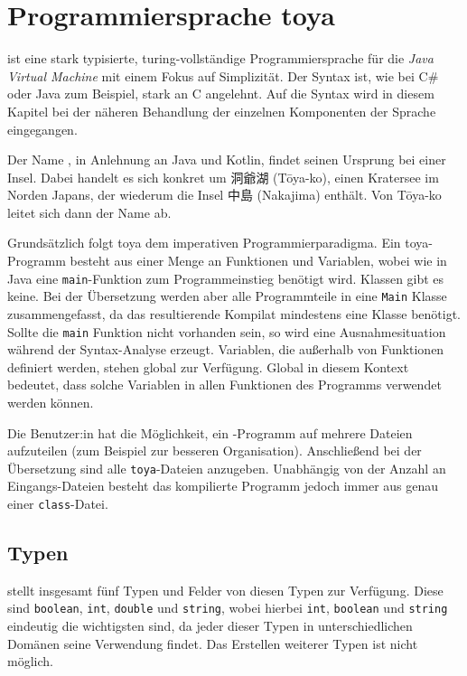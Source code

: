 \chapter{Programmiersprache toya}
\label{cha:toya}

\toya ist eine stark typisierte, turing-vollständige Programmiersprache für die \textit{Java Virtual Machine} mit einem Fokus auf Simplizität. Der Syntax ist, wie bei C\# oder Java zum Beispiel, stark an C angelehnt. Auf die Syntax wird in diesem Kapitel bei der näheren Behandlung der einzelnen Komponenten der Sprache eingegangen. 

\begin{CJK}{UTF8}{ipxm}
Der Name \toya, in Anlehnung an Java und Kotlin, findet seinen Ursprung bei einer Insel. Dabei handelt es sich konkret um 洞爺湖 (Tōya-ko), einen Kratersee im Norden Japans, der wiederum die Insel 中島 (Nakajima) enthält. Von Tōya-ko leitet sich dann der Name \toya ab.
\end{CJK}

Grundsätzlich folgt toya dem imperativen Programmierparadigma. Ein toya-Programm besteht aus einer Menge an Funktionen und Variablen, wobei wie in Java eine \texttt{main}-Funktion zum Programmeinstieg benötigt wird. Klassen gibt es keine. Bei der Übersetzung werden aber alle Programmteile in eine \texttt{Main} Klasse zusammengefasst, da das resultierende Kompilat mindestens eine Klasse benötigt. Sollte die \texttt{main} Funktion nicht vorhanden sein, so wird eine Ausnahmesituation während der Syntax-Analyse erzeugt. Variablen, die außerhalb von Funktionen definiert werden, stehen global zur Verfügung. Global in diesem Kontext bedeutet, dass solche Variablen in allen Funktionen des Programms verwendet werden können.

Die Benutzer:in hat die Möglichkeit, ein \toya-Programm auf mehrere Dateien aufzuteilen (zum Beispiel zur besseren Organisation). Anschließend bei der Übersetzung sind alle \texttt{toya}-Dateien anzugeben. Unabhängig von der Anzahl an Eingangs-Dateien besteht das kompilierte Programm jedoch immer aus genau einer \texttt{class}-Datei.  

\section{Typen}

\toya stellt insgesamt fünf Typen und Felder von diesen Typen zur Verfügung. Diese sind \texttt{boolean}, \texttt{int}, \texttt{double} und \texttt{string}, wobei hierbei \texttt{int}, \texttt{boolean} und \texttt{string} eindeutig die wichtigsten sind, da jeder dieser Typen in unterschiedlichen Domänen seine Verwendung findet. Das Erstellen weiterer Typen ist nicht möglich.

